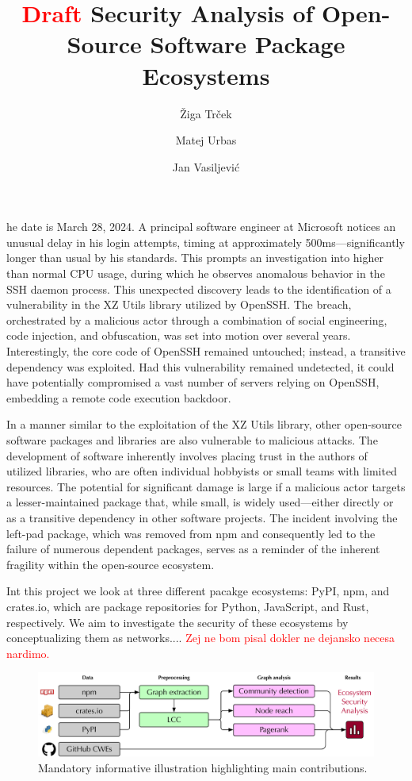\documentclass[9pt,twocolumn,twoside]{pnas-report}
\title{\textcolor{red}{Draft} Security Analysis of Open-Source Software Package Ecosystems}
\author[a]{Žiga Trček}
\author[a]{Matej Urbas}
\author[a]{Jan Vasiljević}
\affil[a]{University of Ljubljana, Faculty of Computer and Information Science, Ve\v{c}na pot 113, SI-1000 Ljubljana, Slovenia}
\begin{document}
\maketitle
\thispagestyle{firststyle}

he date is March 28, 2024. A principal software engineer at Microsoft notices an unusual delay in his login attempts, timing at approximately 500ms—significantly longer than usual by his standards. This prompts an investigation into higher than normal CPU usage, during which he observes anomalous behavior in the SSH daemon process. This unexpected discovery leads to the identification of a vulnerability in the XZ Utils library utilized by OpenSSH. The breach, orchestrated by a malicious actor through a combination of social engineering, code injection, and obfuscation, was set into motion over several years. Interestingly, the core code of OpenSSH remained untouched; instead, a transitive dependency was exploited. Had this vulnerability remained undetected, it could have potentially compromised a vast number of servers relying on OpenSSH, embedding a remote code execution backdoor.


In a manner similar to the exploitation of the XZ Utils library, other open-source software packages and libraries are also vulnerable to malicious attacks.
The development of software inherently involves placing trust in the authors of utilized libraries, who are often individual hobbyists or small teams with limited resources.
The potential for significant damage is large if a malicious actor targets a lesser-maintained package that, while small, is widely used—either directly or as a transitive dependency in other software projects.
The incident involving the left-pad package, which was removed from npm and consequently led to the failure of numerous dependent packages, serves as a reminder of the inherent fragility within the open-source ecosystem.

Int this project we look at three different pacakge ecosystems: PyPI, npm, and crates.io, which are package repositories for Python, JavaScript, and Rust, respectively. We aim to investigate the security of these ecosystems by conceptualizing them as networks.... \textcolor{red}{Zej ne bom pisal dokler ne dejansko necesa nardimo.}

\begin{figure}
	\centering
	\includegraphics[width=1\linewidth]{topdown.pdf}
	\caption{Mandatory informative illustration highlighting main contributions.}
	\label{fig:topdown}
\end{figure}
\end{document}
